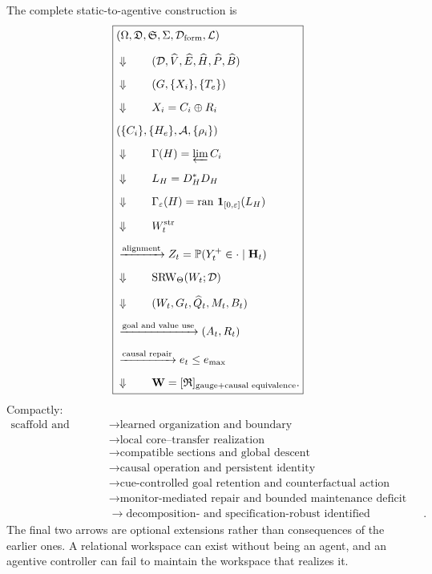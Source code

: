 
The complete static-to-agentive construction is
\[
\boxed{
\begin{aligned}
&
(\Omega,\mathfrak D,\mathfrak S,\Sigma,\mathcal D_{\mathrm{form}},\mathcal L)
\\[2mm]
&\Downarrow
\qquad
(\mathcal D,\widehat V,\widehat E,\widehat H,\widehat P,\widehat B)
\\[2mm]
&\Downarrow
\qquad
(G,\{X_i\},\{T_e\})
\\[2mm]
&\Downarrow
\qquad
X_i=C_i\oplus R_i
\\[2mm]
&
(\{C_i\},\{H_e\},\mathcal A,\{\rho_i\})
\\[2mm]
&\Downarrow
\qquad
\Gamma(H)=\varprojlim C_i
\\[2mm]
&\Downarrow
\qquad
L_H=D_H^*D_H
\\[2mm]
&\Downarrow
\qquad
\Gamma_\varepsilon(H)
=
\operatorname{ran}\,\mathbf 1_{[0,\varepsilon]}(L_H)
\\[2mm]
&\Downarrow
\qquad
W_t^{\mathrm{str}}
\\[2mm]
&\xrightarrow{\text{alignment}}
Z_t=\mathbb P(Y_t^+\in\cdot\mid\mathbf H_t)
\\[2mm]
&\Downarrow
\qquad
\operatorname{SRW}_\Theta(W_t;\mathcal D)
\\[2mm]
&\Downarrow
\qquad
(W_t,G_t,\widehat Q_t,M_t,B_t)
\\[2mm]
&\xrightarrow{\text{goal and value use}}
(A_t,R_t)
\\[2mm]
&\xrightarrow{\text{causal repair}}
e_t\leq e_{\max}
\\[2mm]
&\Downarrow
\qquad
\mathbf W
=
[\mathfrak R]_{\text{gauge}+\text{causal equivalence}}.
\end{aligned}
}
\]
Compactly:
\[
\boxed{
\begin{aligned}
\text{scaffold and history}
&\to
\text{learned organization and boundary}
\\
&\to
\text{local core--transfer realization}
\\
&\to
\text{compatible sections and global descent}
\\
&\to
\text{causal operation and persistent identity}
\\
&\to
\text{cue-controlled goal retention and counterfactual action}
\\
&\to
\text{monitor-mediated repair and bounded maintenance deficit}
\\
&\to
\text{decomposition- and specification-robust identified certification}.
\end{aligned}
}
\]
The final two arrows are optional extensions rather than consequences of the
earlier ones. A relational workspace can exist without being an agent, and an
agentive controller can fail to maintain the workspace that realizes it.
